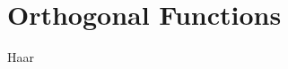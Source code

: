 \documentclass[nociteref]{SIAM-GH-book}
\begin{document}
\part{Orthogonal Functions}
{Haar}
%
%
%
%
%
%
%
%
%
%
%
%
%
\end{document}
